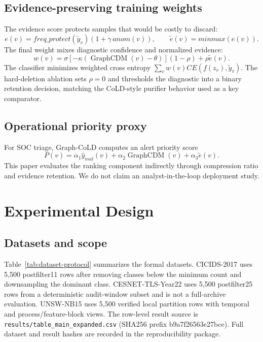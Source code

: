 \documentclass[preprint,review,12pt]{elsarticle}
\begin{document}
\subsection{Evidence-preserving training weights}
The evidence score protects samples that would be costly to discard:
\begin{equation}
e(v)=freq\_protect(\tilde y_v)\left(1+\gamma\,anom(v)\right),\qquad
\tilde e(v)=minmax(e(v)).
\end{equation}
The final weight mixes diagnostic confidence and normalized evidence:
\begin{equation}
w(v)=\sigma\left[-\kappa(\operatorname{GraphCDM}(v)-\theta)\right](1-\rho)
+\rho\tilde e(v).
\end{equation}
The classifier minimizes weighted cross entropy
$\sum_v w(v)CE(f(z_v),\tilde y_v)$. The hard-deletion ablation sets $\rho=0$ and
thresholds the diagnostic into a binary retention decision, matching the
CoLD-style purifier behavior used as a key comparator.

\subsection{Operational priority proxy}
For SOC triage, Graph-CoLD computes an alert priority score
\begin{equation}
P(v)=\alpha_1\hat y_{mal}(v)+\alpha_2\operatorname{GraphCDM}(v)+\alpha_3\tilde e(v).
\end{equation}
This paper evaluates the ranking component indirectly through compression ratio
and evidence retention. We do not claim an analyst-in-the-loop deployment study.

\section{Experimental Design}
\subsection{Datasets and scope}
Table~\ref{tab:dataset-protocol} summarizes the formal datasets. CICIDS-2017
uses 5,500 postfilter11 rows
after removing classes below the minimum count and downsampling the dominant
class. CESNET-TLS-Year22 uses 5,500
postfilter25 rows from a deterministic audit-window subset and is not a
full-archive evaluation. UNSW-NB15 uses 5,500
verified local partition rows with temporal and process/feature-block views.
The row-level result source is \texttt{results/table\_main\_expanded.csv}
(SHA256 prefix b9a7f26563e27bce). Full dataset and result hashes are recorded in
the reproducibility package.
\end{document}
